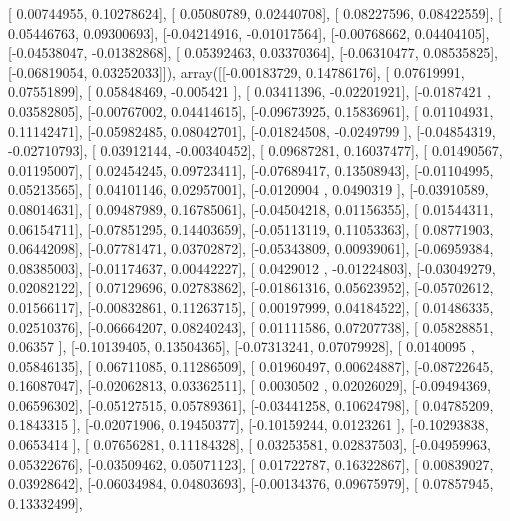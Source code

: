 \documentclass{article}
\begin{document}
       [ 0.00744955,  0.10278624],
       [ 0.05080789,  0.02440708],
       [ 0.08227596,  0.08422559],
       [ 0.05446763,  0.09300693],
       [-0.04214916, -0.01017564],
       [-0.00768662,  0.04404105],
       [-0.04538047, -0.01382868],
       [ 0.05392463,  0.03370364],
       [-0.06310477,  0.08535825],
       [-0.06819054,  0.03252033]]), array([[-0.00183729,  0.14786176],
       [ 0.07619991,  0.07551899],
       [ 0.05848469, -0.005421  ],
       [ 0.03411396, -0.02201921],
       [-0.0187421 ,  0.03582805],
       [-0.00767002,  0.04414615],
       [-0.09673925,  0.15836961],
       [ 0.01104931,  0.11142471],
       [-0.05982485,  0.08042701],
       [-0.01824508, -0.0249799 ],
       [-0.04854319, -0.02710793],
       [ 0.03912144, -0.00340452],
       [ 0.09687281,  0.16037477],
       [ 0.01490567,  0.01195007],
       [ 0.02454245,  0.09723411],
       [-0.07689417,  0.13508943],
       [-0.01104995,  0.05213565],
       [ 0.04101146,  0.02957001],
       [-0.0120904 ,  0.0490319 ],
       [-0.03910589,  0.08014631],
       [ 0.09487989,  0.16785061],
       [-0.04504218,  0.01156355],
       [ 0.01544311,  0.06154711],
       [-0.07851295,  0.14403659],
       [-0.05113119,  0.11053363],
       [ 0.08771903,  0.06442098],
       [-0.07781471,  0.03702872],
       [-0.05343809,  0.00939061],
       [-0.06959384,  0.08385003],
       [-0.01174637,  0.00442227],
       [ 0.0429012 , -0.01224803],
       [-0.03049279,  0.02082122],
       [ 0.07129696,  0.02783862],
       [-0.01861316,  0.05623952],
       [-0.05702612,  0.01566117],
       [-0.00832861,  0.11263715],
       [ 0.00197999,  0.04184522],
       [ 0.01486335,  0.02510376],
       [-0.06664207,  0.08240243],
       [ 0.01111586,  0.07207738],
       [ 0.05828851,  0.06357   ],
       [-0.10139405,  0.13504365],
       [-0.07313241,  0.07079928],
       [ 0.0140095 ,  0.05846135],
       [ 0.06711085,  0.11286509],
       [ 0.01960497,  0.00624887],
       [-0.08722645,  0.16087047],
       [-0.02062813,  0.03362511],
       [ 0.0030502 ,  0.02026029],
       [-0.09494369,  0.06596302],
       [-0.05127515,  0.05789361],
       [-0.03441258,  0.10624798],
       [ 0.04785209,  0.1843315 ],
       [-0.02071906,  0.19450377],
       [-0.10159244,  0.0123261 ],
       [-0.10293838,  0.0653414 ],
       [ 0.07656281,  0.11184328],
       [ 0.03253581,  0.02837503],
       [-0.04959963,  0.05322676],
       [-0.03509462,  0.05071123],
       [ 0.01722787,  0.16322867],
       [ 0.00839027,  0.03928642],
       [-0.06034984,  0.04803693],
       [-0.00134376,  0.09675979],
       [ 0.07857945,  0.13332499],
\end{document}
